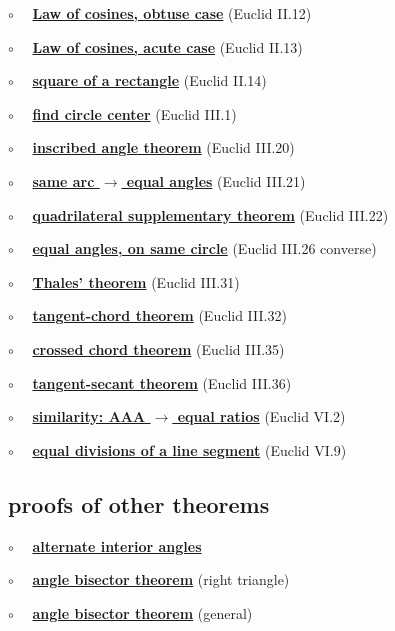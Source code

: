 \documentclass[11pt, oneside]{article}
\begin{document}
$\circ$ \ \ \hyperref[sec:law_of_cosines]{\textbf{Law of cosines, obtuse case}} (Euclid II.12)

$\circ$ \ \ \hyperref[sec:law_of_cosines]{\textbf{Law of cosines, acute case}} (Euclid II.13)

$\circ$ \ \ \hyperref[sec:Euclid_II_14]{\textbf{square of a rectangle}} (Euclid II.14)

$\circ$ \ \ \hyperref[sec:find_circle_center]{\textbf{find circle center}} (Euclid III.1)

$\circ$ \ \ \hyperref[sec:inscribed_angle_theorem]{\textbf{inscribed angle theorem}} (Euclid III.20)

$\circ$ \ \ \hyperref[sec:angles_on_same_arc]{\textbf{same arc $\rightarrow$ equal angles}} (Euclid III.21)

$\circ$ \ \ \hyperref[sec:quadrilateral_supplementary]{\textbf{quadrilateral supplementary theorem}} (Euclid III.22)

$\circ$ \ \ \hyperref[sec:equal_angle_on_circle_contradiction]{\textbf{equal angles, on same circle}} (Euclid III.26 converse)

$\circ$ \ \ \hyperref[sec:Thales_theorem]{\textbf{Thales' theorem}} (Euclid III.31)

$\circ$ \ \ \hyperref[sec:tangent_chord_theorem]{\textbf{tangent-chord theorem}} (Euclid III.32)

$\circ$ \ \ \hyperref[sec:chord_segments]{\textbf{crossed chord theorem}} (Euclid III.35)

$\circ$ \ \ \hyperref[sec:secant_tangent_theorem]{\textbf{tangent-secant theorem}} (Euclid III.36)

$\circ$ \ \ \hyperref[sec:Euclid_VI_2]{\textbf{similarity:  AAA $\rightarrow$ equal ratios}} (Euclid VI.2)

$\circ$ \ \ \hyperref[sec:Euclid_VI_9]{\textbf{equal divisions of a line segment}} (Euclid VI.9)


\subsection*{proofs of other theorems}

$\circ$ \ \  \hyperref[sec:alternate_interior_angle_theorem]{\textbf{alternate interior angles}}

$\circ$ \ \ \hyperref[sec:angle_bisector_theorem]{\textbf{angle bisector theorem}} (right triangle)

$\circ$ \ \ \hyperref[sec:generalized_angle_bisector_theorem]{\textbf{angle bisector theorem}} (general)
\end{document}
